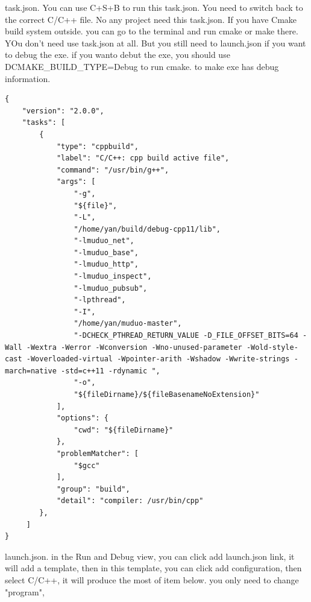 \documentclass[paper=8.5in:11in, twoside, 12pt, pagesize=pdftex]{book}
\begin{document}
task.json. You can use C+S+B to run this task.json. You need to switch back to the correct C/C++ file. No any project need this task.json. If you have Cmake build system outside. you can go to the terminal and run cmake or make there. YOu don't need use task.json at all.  But you still need to launch.json if you want to debug the exe. if you wanto debut the exe, you should use DCMAKE\_BUILD\_TYPE=Debug to run cmake. to make exe has debug information. 

\begin{lstlisting}[mathescape=false]
{
    "version": "2.0.0",
    "tasks": [
        {
            "type": "cppbuild",
            "label": "C/C++: cpp build active file",
            "command": "/usr/bin/g++",
            "args": [
                "-g",
                "${file}",
                "-L",
                "/home/yan/build/debug-cpp11/lib",
                "-lmuduo_net",
                "-lmuduo_base",
                "-lmuduo_http",
                "-lmuduo_inspect",
                "-lmuduo_pubsub",
                "-lpthread",
                "-I",
                "/home/yan/muduo-master",
                "-DCHECK_PTHREAD_RETURN_VALUE -D_FILE_OFFSET_BITS=64 -Wall -Wextra -Werror -Wconversion -Wno-unused-parameter -Wold-style-cast -Woverloaded-virtual -Wpointer-arith -Wshadow -Wwrite-strings -march=native -std=c++11 -rdynamic ",
                "-o",
                "${fileDirname}/${fileBasenameNoExtension}"
            ],
            "options": {
                "cwd": "${fileDirname}"
            },
            "problemMatcher": [
                "$gcc"
            ],
            "group": "build",
            "detail": "compiler: /usr/bin/cpp"
        },
     ]
}
\end{lstlisting}

launch.json.  in the Run and Debug view, you can click add launch.json link, it will add a template, then in this template, you can click add configuration, then select C/C++, it will produce the most of item below. you only need to change "program", 
\end{document}
